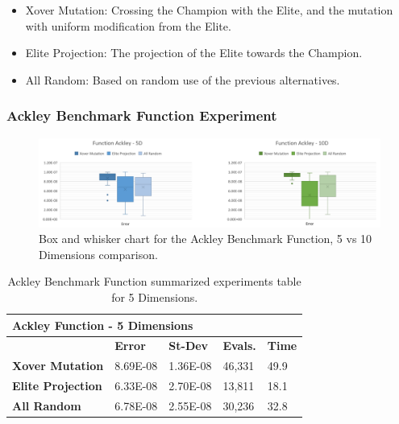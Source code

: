 \documentclass[graybox]{svmult}
\begin{document}
\begin{itemize}
    \item   Xover Mutation:      Crossing the Champion with the Elite, and the mutation with uniform modification from the Elite.
    \item   Elite Projection:    The projection of the Elite towards the Champion. 
    \item   All Random:          Based on random use of the previous alternatives.
\end{itemize}

\subsubsection{Ackley Benchmark Function Experiment}

\begin{figure}
    \includegraphics[width=\textwidth]{img/fig_fun_ackley.pdf}
    \caption{Box and whisker chart for the Ackley Benchmark Function, 5 vs 10 Dimensions comparison.} \label{fig.fun_ackley}
    \end{figure}

\begin{table}[]
    \scriptsize
    \centering
    \caption{Ackley Benchmark Function summarized experiments table for 5 Dimensions.}\label{tab.benchmark_fun_ackley5}
    \begin{tabular}{@{}lllll@{}}
    \toprule
    \multicolumn{5}{l}{\textbf{Ackley Function - 5 Dimensions}} \\ \midrule
     & \textbf{Error} & \textbf{St-Dev} & \textbf{Evals.} & \textbf{Time} \\
    \textbf{Xover Mutation} & 8.69E-08 & 1.36E-08 & 46,331 & 49.9 \\
    \textbf{Elite Projection} & 6.33E-08 & 2.70E-08 & 13,811 & 18.1 \\
    \textbf{All Random} & 6.78E-08 & 2.55E-08 & 30,236 & 32.8 \\ \bottomrule
    \end{tabular}
    \end{table}
\end{document}
